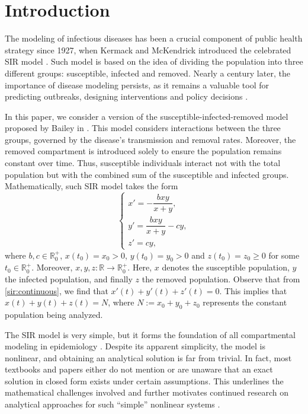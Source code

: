 \documentclass[pdflatex,sn-mathphys-num]{sn-jnl}
\theoremstyle{remark}
\begin{document}

\section{Introduction}
\label{sec1}

The modeling of infectious diseases has been a crucial component of public health 
strategy since 1927, when Kermack and McKendrick introduced the celebrated SIR 
model \cite{kermack:mckendrick}. Such model is based on the idea of dividing
the population into three different groups: susceptible, infected and removed. 
Nearly a century later, the importance of disease modeling persists, as it 
remains a valuable tool for predicting outbreaks, designing interventions 
and policy decisions \cite{MyID:468,TM1,Hattaf2013}.

In this paper, we consider a version of the susceptible-infected-removed model 
proposed by Bailey in \cite{bailey}. This model considers interactions between 
the three groups, governed by the disease's transmission and removal rates. 
Moreover, the removed compartment is introduced solely to ensure the population 
remains constant over time. Thus, susceptible individuals interact not
with the total population but with the combined sum of the susceptible and 
infected groups. Mathematically, such SIR model takes the form 
\begin{equation}
\label{sir:continuous}
\begin{cases}
x' = -\dfrac{b x y}{x+y}, \\
y' = \dfrac{b x y}{x+y} - cy, \\
z' = cy,
\end{cases}
\end{equation}
where $b, c \in \mathbb{R}^+_0$, $x(t_0) = x_0 > 0$, $y(t_0) = y_0 > 0$ 
and $z(t_0) = z_0 \geq 0$ for some $t_0 \in \mathbb{R}_0^+$. Moreover, 
$x, y, z : \mathbb{R} \rightarrow \mathbb{R}^+_0$. Here, $x$ denotes the
susceptible population, $y$ the infected population, and finally $z$ the
removed population. Observe that from \eqref{sir:continuous}, we find that 
$x'(t) + y'(t) + z'(t) = 0$. This implies that $x(t) + y(t) + z(t) = N$, 
where $N := x_0 + y_0 + z_0$ represents the constant population being 
analyzed. 

The SIR model is very simple, but it forms the foundation of all compartmental 
modeling in epidemiology \cite{MR4368314,s11071-024-09710-9,s11071-025-11006-5}. 
Despite its apparent simplicity, the model is nonlinear, and 
obtaining an analytical solution is far from trivial. In fact, most textbooks and papers 
either do not mention or are unaware that an exact solution in closed form exists under 
certain assumptions. This underlines the mathematical challenges involved and further 
motivates continued research on analytical approaches for such ``simple'' nonlinear systems
\cite{sir:ts,MR4492457,MR4692913}.
\end{document}
